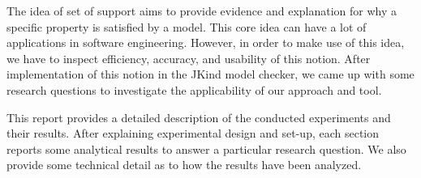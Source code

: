 ﻿The idea of set of support aims to provide evidence and explanation for why a specific property is satisfied by a model. 
This core idea can have a lot of applications in software engineering. However, in order to make use of this idea, we have to inspect efficiency, accuracy, and usability of this notion. After implementation of this notion in the JKind model checker, we came up with some research questions to investigate the applicability of our approach and tool. 

This report provides a detailed description of the conducted experiments and their results. After explaining experimental design and set-up, each section reports some analytical results to answer a particular research question. We also provide some technical detail as to how the results have been analyzed.


